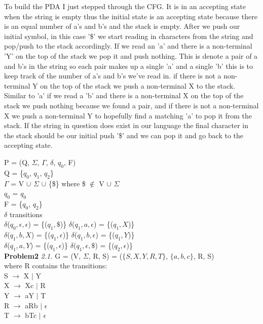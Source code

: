 \documentclass[12pt]{report}
\begin{document}
To build the PDA I just stepped through the CFG.  It is in an accepting state when the string is empty thus the initial state is an accepting state because there is an equal number of a's and b's and the stack is empty.  After we push our initial symbol, in this case '\$' we start reading in characters from the string and pop/push to the stack accordingly.  If we read an 'a' and there is a non-terminal 'Y' on the top of the stack we pop it and push nothing.  This is denote a pair of a and b's in the string so each pair makes up a single 'a' and a single 'b' this is to keep track of the number of a's and b's we've read in.  if there is not a non-terminal Y on the top of the stack we push a non-terminal X to the stack.  Similar to 'a' if we read a 'b' and there is a non-terminal X on the top of the stack we push nothing because we found a pair, and if there is not a non-terminal X we push a non-terminal Y to hopefully find a matching 'a' to pop it from the stack.  If the string in question does exist in our language the final character in the stack should be our initial push '\$' and we can pop it and go back to the accepting state.

P = (Q, $\Sigma$, $\Gamma$, $\delta$, $q_0$, F)\\
\tab Q = \{$q_0$, $q_1$, $q_2$\}\\
\tab $\Gamma$ = V $\cup$ $\Sigma$ $\cup$ \{\$\} where \$ $\notin$ V $\cup$ $\Sigma$\\
\tab $q_0$ = $q_0$\\
\tab F = \{$q_0$, $q_2$\}\\
\tab $\delta$ transitions \\
\tab\tab $\delta$($q_0, \epsilon, \epsilon$) = \{($q_1, \$$)\}
\tab\tab $\delta$($q_1, a, \epsilon$) = \{($q_1, X$)\}\\
\tab\tab $\delta$($q_1, b, X$) = \{($q_1, \epsilon$)\}
\tab\tab $\delta$($q_1, b, \epsilon$) = \{($q_1, Y$)\}\\
\tab\tab $\delta$($q_1, a, Y$) = \{($q_1, \epsilon$)\}
\tab\tab $\delta$($q_1, \epsilon, \$$) = \{($q_2, \epsilon$)\}\\



\textbf{ Problem2}\newline
\textit{2.1.}
G = (V, $\Sigma$, R, S) = ($\{S,X,Y,R,T\}$, $\{a,b,c\}$, R, S) \\
where R contains the transitions:\\
\tab S $\rightarrow$ X $\vert$ Y\\
\tab X $\rightarrow$ Xc $\vert$ R\\
\tab Y $\rightarrow$ aY $\vert$ T\\
\tab R $\rightarrow$ aRb $\vert$ $\epsilon$\\
\tab T $\rightarrow$ bTc $\vert$ $\epsilon$\\
\end{document}
